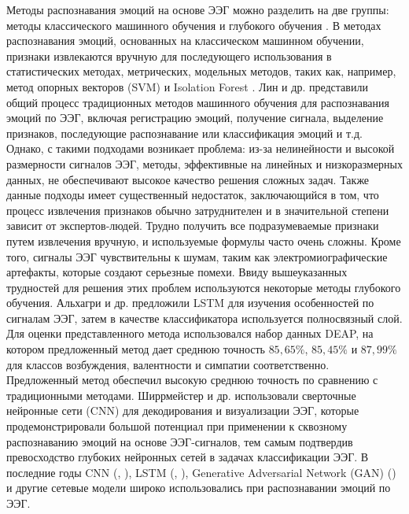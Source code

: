 \documentclass{article}
\begin{document}
Методы распознавания эмоций на основе ЭЭГ можно разделить на две группы: методы классического машинного обучения и глубокого обучения \citep{sensors18}. В методах распознавания эмоций, основанных на классическом машинном обучении, признаки извлекаются вручную для последующего использования в статистических методах, метрических, модельных методов, таких как, например, метод опорных векторов (SVM) \citet{scholkopfsuppor} и Isolation Forest \citet{liu2008isolation}. Лин и др. \citet{sensors18} представили общий процесс традиционных методов машинного обучения для распознавания эмоций по ЭЭГ, включая регистрацию эмоций, получение сигнала, выделение признаков, последующие распознавание или классификация эмоций и т.д. Однако, с такими подходами возникает проблема: из-за нелинейности и высокой размерности сигналов ЭЭГ, методы, эффективные на линейных и низкоразмерных данных, не обеспечивают высокое качество решения сложных задач. Также данные подходы имеет существенный недостаток, заключающийся в том, что процесс извлечения признаков обычно затруднителен и в значительной степени зависит от экспертов-людей. Трудно получить все подразумеваемые признаки путем извлечения вручную, и используемые формулы часто очень сложны. Кроме того, сигналы ЭЭГ чувствительны к шумам, таким как электромиографические артефакты, которые создают серьезные помехи. Ввиду вышеуказанных трудностей для решения этих проблем используются некоторые методы глубокого обучения. Альхагри и др. \citep{lstm} предложили LSTM для изучения особенностей по сигналам ЭЭГ, затем в качестве классификатора используется полносвязный слой. Для оценки представленного метода использовался набор данных DEAP, на котором предложенный метод дает среднюю точность $85,65\%$, $85,45\%$ и $87,99\%$ для классов возбуждения, валентности и симпатии соответственно. Предложенный метод обеспечил высокую среднюю точность по сравнению с традиционными методами. Ширрмейстер и др. \citep{cnn} использовали сверточные нейронные сети (CNN) для декодирования и визуализации ЭЭГ, которые продемонстрировали большой потенциал при применении к сквозному распознаванию эмоций на основе ЭЭГ-сигналов, тем самым подтвердив превосходство глубоких нейронных сетей в задачах классификации ЭЭГ. В последние годы CNN (\citep{sensors_cnn}, \citep{med_cnn}), LSTM (\citep{lstm}, \citep{sharma}), Generative Adversarial Network (GAN) (\citep{gan}) и другие сетевые модели широко использовались при распознавании эмоций по ЭЭГ.
\end{document}
